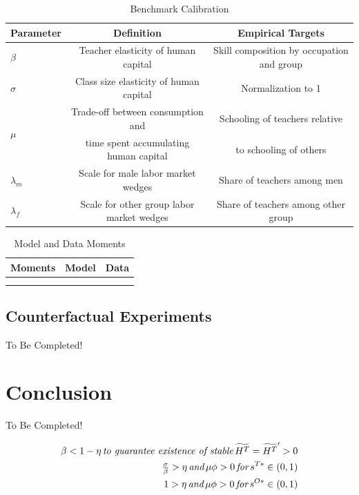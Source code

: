 \documentclass[onehalfspacing,11pt]{article}
\begin{document}
		\begin{table}[h!]
		\centering
		\begin{tabular}{lcc}
			\toprule
			\toprule
			Parameter & Definition & Empirical Targets\\
			\midrule
			$\beta$ & Teacher elasticity of human capital & Skill composition by occupation and group \\
			$\sigma$ & Class size elasticity of human capital & Normalization to 1\\
			\multirow{2}{*}{$\mu$} &  Trade-off between consumption and & Schooling of teachers relative\\
			& time spent accumulating human capital & to schooling of others\\
			$\lambda_m$ & Scale for male labor market wedges & Share of teachers among men\\
		    $\lambda_f$ & Scale for other group labor market wedges & Share of teachers among other group\\
			\bottomrule
		\end{tabular}
		\caption{Benchmark Calibration}
		\label{tab:calibr}
	\end{table}
	
	\begin{table}[h!]
		\centering
		\begin{tabular}{lcc}
			\toprule
			\toprule
			Moments & Model & Data \\
			\midrule
			& & \\
			& & \\
			\bottomrule
		\end{tabular}
		\caption{Model and Data Moments}
		\label{tab:mom}
	\end{table}
	


\subsection{Counterfactual Experiments}
{\sc To Be Completed!}
\section{Conclusion}\label{sec:conclusion}
{\sc To Be Completed!}
\newpage





\newpage
\begin{align}
\beta < 1-\eta \textit{\,to guarantee existence of stable\,} \widetilde{H^T} = \widetilde{H^T}' > 0 \nonumber\\
\tfrac{\sigma}{\beta} > \eta \textit{\,and\,} \mu \phi > 0 \textit{\,for\,} s^{T*} \in (0,1) \nonumber\\
1 > \eta \textit{\,and\,} \mu \phi > 0 \textit{\,for\,} s^{O*} \in (0,1) \nonumber
\end{align}
\end{document}
